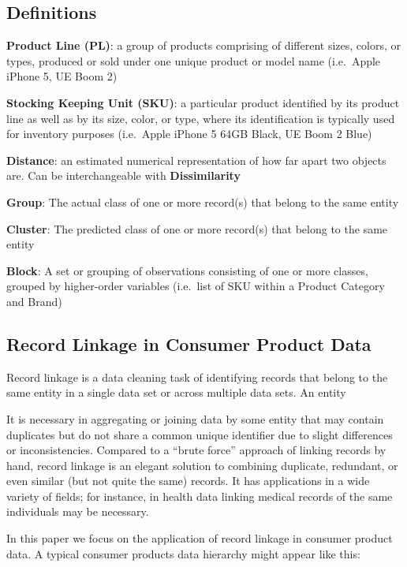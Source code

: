 \documentclass[]{article}
\begin{document}
\subsection{Definitions}\label{definitions}

\textbf{Product Line (PL)}: a group of products comprising of different
sizes, colors, or types, produced or sold under one unique product or
model name (i.e.~Apple iPhone 5, UE Boom 2)

\textbf{Stocking Keeping Unit (SKU)}: a particular product identified by
its product line as well as by its size, color, or type, where its
identification is typically used for inventory purposes (i.e.~Apple
iPhone 5 64GB Black, UE Boom 2 Blue)

\textbf{Distance}: an estimated numerical representation of how far
apart two objects are. Can be interchangeable with
\textbf{Dissimilarity}

\textbf{Group}: The actual class of one or more record(s) that belong to
the same entity

\textbf{Cluster}: The predicted class of one or more record(s) that
belong to the same entity

\textbf{Block}: A set or grouping of observations consisting of one or
more classes, grouped by higher-order variables (i.e.~list of SKU within
a Product Category and Brand)

\subsection{Record Linkage in Consumer Product
Data}\label{record-linkage-in-consumer-product-data}

Record linkage is a data cleaning task of identifying records that
belong to the same entity in a single data set or across multiple data
sets. An entity

It is necessary in aggregating or joining data by some entity that may
contain duplicates but do not share a common unique identifier due to
slight differences or inconsistencies. Compared to a ``brute force''
approach of linking records by hand, record linkage is an elegant
solution to combining duplicate, redundant, or even similar (but not
quite the same) records. It has applications in a wide variety of
fields; for instance, in health data linking medical records of the same
individuals may be necessary.

In this paper we focus on the application of record linkage in consumer
product data. A typical consumer products data hierarchy might appear
like this:
\end{document}
